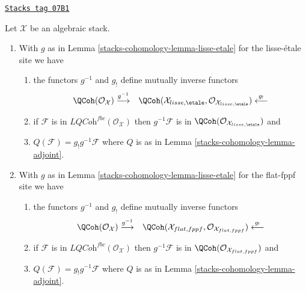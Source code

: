 \begin{lemma}
\label{stacks-cohomology-lemma-quasi-coherent}
\href{https://stacks.math.columbia.edu/tag/07B1}{\texttt{Stacks tag 07B1}}

Let $\mathcal{X}$ be an algebraic stack.
\begin{enumerate}
\item With $g$ as in Lemma \ref{stacks-cohomology-lemma-lisse-etale}
for the lisse-\'etale site we have
\begin{enumerate}
\item the functors $g^{-1}$ and $g_!$ define mutually inverse functors
$$
\begin{array}{cc}\QCoh(\mathcal{O}_\mathcal{X}) \overset{g^{-1}}{\longrightarrow} & \QCoh(\mathcal{X}_{lisse,\etale},
\mathcal{O}_{\mathcal{X}_{lisse,\etale}}) \overset{g_!}{\longleftarrow}\end{array}
$$
\item if $\mathcal{F}$ is in $\textit{LQCoh}^{fbc}(\mathcal{O}_\mathcal{X})$
then $g^{-1}\mathcal{F}$ is in
$\QCoh(\mathcal{O}_{\mathcal{X}_{lisse,\etale}})$ and
\item $Q(\mathcal{F}) = g_!g^{-1}\mathcal{F}$ where $Q$ is as in
Lemma \ref{stacks-cohomology-lemma-adjoint}.
\end{enumerate}
\item With $g$ as in Lemma \ref{stacks-cohomology-lemma-lisse-etale}
for the flat-fppf site we have
\begin{enumerate}
\item the functors $g^{-1}$ and $g_!$ define mutually inverse functors
$$
\begin{array}{cc}\QCoh(\mathcal{O}_\mathcal{X}) \overset{g^{-1}}{\longrightarrow} & \QCoh(\mathcal{X}_{flat,fppf},
\mathcal{O}_{\mathcal{X}_{flat,fppf}}) \overset{g_!}{\longleftarrow}\end{array}
$$
\item if $\mathcal{F}$ is in $\textit{LQCoh}^{fbc}(\mathcal{O}_\mathcal{X})$
then $g^{-1}\mathcal{F}$ is in
$\QCoh(\mathcal{O}_{\mathcal{X}_{flat,fppf}})$
and
\item $Q(\mathcal{F}) = g_!g^{-1}\mathcal{F}$ where $Q$ is as in
Lemma \ref{stacks-cohomology-lemma-adjoint}.
\end{enumerate}
\end{enumerate}
\end{lemma}

